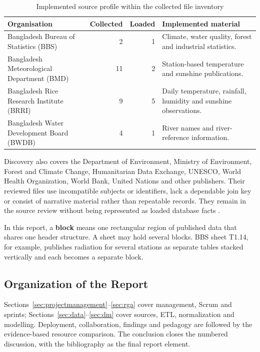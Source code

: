 \begin{table}[H]
\centering
\caption{Implemented source profile within the collected file inventory}
\label{tab:organisations}
\begin{tabular}{L{0.31\textwidth}r r L{0.38\textwidth}}
\toprule
Organisation & Collected & Loaded & Implemented material \\
\midrule
Bangladesh Bureau of Statistics (BBS) & 2 & 1 & Climate, water quality,
forest and industrial statistics. \\
Bangladesh Meteorological Department (BMD) & 11 & 2 & Station-based
temperature and sunshine publications. \\
Bangladesh Rice Research Institute (BRRI) & 9 & 5 & Daily temperature,
rainfall, humidity and sunshine observations. \\
Bangladesh Water Development Board (BWDB) & 4 & 1 & River names and
river-reference information. \\
\bottomrule
\end{tabular}
\end{table}

Discovery also covers the Department of Environment, Ministry of Environment,
Forest and Climate Change, Humanitarian Data Exchange, UNESCO, World Health
Organization, World Bank, United Nations and other publishers. Their reviewed
files use incompatible subjects or identifiers, lack a dependable join key or
consist of narrative material rather than repeatable records. They remain in
the source review without being represented as loaded database facts
\cite{hdx_bangladesh}.

In this report, a \textbf{block} means one rectangular region of published
data that shares one header structure. A sheet may hold several blocks. BBS
sheet T1.14, for example, publishes radiation for several stations as separate
tables stacked vertically and each becomes a separate block.

\subsection{Organization of the Report}
\label{subsec:org}

Sections~\ref{sec:projectmanagement}--\ref{sec:rga} cover management, Scrum and
sprints; Sections~\ref{sec:data}--\ref{sec:dm} cover sources, ETL,
normalization and modelling. Deployment, collaboration, findings and pedagogy
are followed by the evidence-based resource comparison. The conclusion closes
the numbered discussion, with the bibliography as the final report element.
